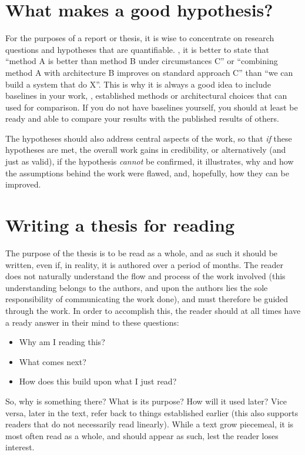 \documentclass[ twoside,openright,titlepage,numbers=noenddot,headinclude,%
                footinclude=true,cleardoublepage=empty,abstractoff, %
                BCOR=5mm,paper=a4,fontsize=11pt,%
                ngerman,american,%
                ]{scrreprt}
\begin{document}
\section{What makes a good hypothesis?}
\label{sec:what-makes-good}

For the purposes of a report or thesis, it is wise to concentrate on
research questions and hypotheses that are quantifiable. \Eg, it is
better to state that ``method A is better than method B under
circumstances C'' or ``combining method A with architecture B improves
on standard approach C'' than ``we can build a system that do X''.
This is why it is always a good idea to include baselines in your
work, \ie, established methods or architectural choices that can used
for comparison. If you do not have baselines yourself, you should at
least be ready and able to compare your results with the published
results of others.

The hypotheses should also address central aspects of the work, so
that \emph{if} these hypotheses are met, the overall work gains in
credibility, or alternatively (and just as valid), if the hypothesis
\emph{cannot} be confirmed, it illustrates, why and how the
assumptions behind the work were flawed, and, hopefully, how they can
be improved.

\section{Writing a thesis for reading}
\label{sec:writ-thes-read}

The purpose of the thesis is to be read as a whole, and as such it
should be written, even if, in reality, it is authored over a period
of months.  The reader does not naturally understand the flow and
process of the work involved (this understanding belongs to the
authors, and upon the authors lies the sole responsibility of
communicating the work done), and must therefore be guided through the
work.  In order to accomplish this, the reader should at
all times have a ready answer in their mind to these questions:

\begin{itemize}
\item Why am I reading this?
\item What comes next?
\item How does this build upon what I just read?
\end{itemize}

So, why is something there? What is its purpose? How will it used
later? Vice versa, later in the text, refer back to things established
earlier (this also supports readers that do not necessarily read
linearly). While a text grow piecemeal, it is most often read as a
whole, and should appear as such, lest the reader loses interest.
\end{document}
